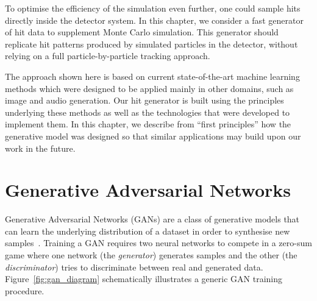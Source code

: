 To optimise the efficiency of the simulation even further, one could sample hits
directly inside the detector system. In this chapter, we consider a fast
generator of hit data to supplement Monte Carlo simulation. This generator
should replicate hit patterns produced by simulated particles in the detector,
without relying on a full particle-by-particle tracking approach. 

The approach shown here is based on current state-of-the-art machine learning
methods which were designed to be applied mainly in other domains, such as image
and audio generation. Our hit generator is built using the principles underlying
these methods as well as the technologies that were developed to implement them.
In this chapter, we describe from ``first principles'' how the generative model
was designed so that similar applications may build upon our work in the future.



\section{Generative Adversarial Networks}
Generative Adversarial Networks (GANs) are a class of generative models that can
learn the underlying distribution of a dataset in order to synthesise new
samples~\cite{goodfellow_generative_2014}. Training a GAN requires two neural
networks to compete in a zero-sum game where one network (the \emph{generator})
generates samples and the other (the \emph{discriminator}) tries to discriminate
between real and generated data. Figure~\ref{fig:gan_diagram} schematically
illustrates a generic GAN training procedure.



